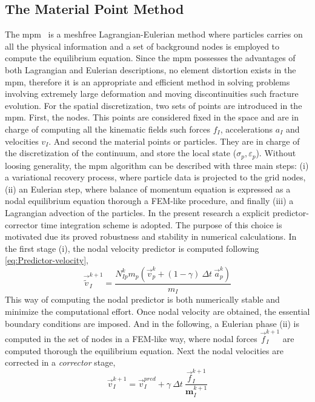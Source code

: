 \message{ !name(2020_EFM_MPM_Eigensoftening.tex)}\documentclass[preprint,12pt,a4paper]{elsarticle}
\newcommand{\tens}[1]{
  \ensuremath{\mathbf{{#1}}}
}
\begin{document}
\subsection{The Material Point Method}
\label{sec:2.1}
The \acrshort{mpm}~\cite{Sulsky1994} is a meshfree Lagrangian-Eulerian method
where particles carries on all the physical information and a set of
background nodes is employed to compute the equilibrium
equation. Since the \acrshort{mpm} possesses the advantages of both Lagrangian
and Eulerian descriptions, no element distortion exists in the \acrshort{mpm},
therefore it is an appropriate and efficient method in solving
problems involving extremely large deformation and moving
discontinuities such fracture evolution. For the spatial
discretization, two sets of points are introduced in 
the \acrshort{mpm}. First, the nodes. This points are considered fixed in the
space and are in charge of computing all the kinematic fields such
forces $f_I$, accelerations $a_I$ and velocities $v_I$. And second the
material points or particles. They are in charge of the discretization
of the continuum, and store the local state ($\sigma_p,
\varepsilon_p$). Without loosing generality, the \acrshort{mpm} algorithm
can be described with three main steps: (i) a variational recovery
process, where particle data is projected to the grid nodes, (ii) an
Eulerian step, where balance of momentum equation is expressed as a
nodal equilibrium equation thorough a FEM-like procedure, and finally
(iii) a Lagrangian advection of the particles. In the present research
a explicit predictor-corrector time integration
scheme is adopted. The purpose of this choice is motivated due its proved
robustness and stability in numerical calculations. In the first stage
(i), the nodal velocity predictor is computed following
\eqref{eq:Predictor-velocity}, 
\begin{equation}
  \label{eq:Predictor-velocity}
  \vec{\tilde{v}}_I^{k+1} = \frac{ N_{Ip}^{k} m_p (\vec{v}_p^k + (1 - \gamma)\ \Delta t\ \vec{a}_p^k)}{m_I}
\end{equation}
This way of computing the nodal predictor is both numerically stable
and minimize the computational effort. Once nodal velocity are
obtained, the essential boundary conditions are imposed. And in the
following, a Eulerian phase (ii) is computed in the set of nodes in a
FEM-like way, where nodal forces $\vec{f}_{I}^{k+1}$ are computed thorough the
equilibrium equation. Next the nodal velocities are corrected in a
\textit{corrector} stage,
\begin{equation}
  \label{eq:Corrector-velocity}
  \vec{v}_{I}^{k+1} = \vec{v}_{I}^{pred} + \gamma\ \Delta t\ \frac{\vec{f}_{I}^{k+1}}{\tens{m}_I^{k+1}}
\end{equation}
\end{document}
